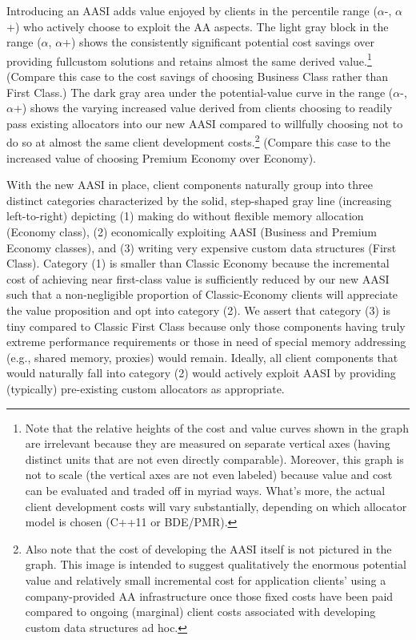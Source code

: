 Introducing an AASI adds value enjoyed by clients in the percentile range ($\alpha$-, $\alpha$+)
who actively choose to exploit the AA aspects. The light gray block in the range ($\alpha$,
$\alpha$+) shows the consistently significant potential cost savings over providing fullcustom solutions and retains almost the same derived value.\footnote{Note that the relative heights of the cost and value curves shown in the graph are irrelevant
because they are measured on separate vertical axes (having distinct units that are not even directly
comparable). Moreover, this graph is not to scale (the vertical axes are not even labeled) because
value and cost can be evaluated and traded off in myriad ways. What’s more, the actual client
development costs will vary substantially, depending on which allocator model is chosen (C++11 or
BDE/PMR).} (Compare this case to
the cost savings of choosing Business Class rather than First Class.) The dark gray
area under the potential-value curve in the range ($\alpha$-, $\alpha$+) shows the varying
increased value derived from clients choosing to readily pass existing allocators into
our new AASI compared to willfully choosing not to do so at almost the same client
development costs.\footnote{Also note that the cost of developing the AASI itself is not pictured in the graph. This image is
intended to suggest qualitatively the enormous potential value and relatively small incremental cost
for application clients’ using a company-provided AA infrastructure once those fixed costs have been
paid compared to ongoing (marginal) client costs associated with developing custom data structures
ad hoc.}  (Compare this case to the increased value of choosing Premium
Economy over Economy).

With the new AASI in place, client components naturally group into three distinct
categories characterized by the solid, step-shaped gray line (increasing left-to-right)
depicting (1) making do without flexible memory allocation (Economy class), (2)
economically exploiting AASI (Business and Premium Economy classes), and (3)
writing very expensive custom data structures (First Class). Category (1) is smaller
than Classic Economy because the incremental cost of achieving near first-class
value is sufficiently reduced by our new AASI such that a non-negligible proportion
of Classic-Economy clients will appreciate the value proposition and opt into
category (2). We assert that category (3) is tiny compared to Classic First Class
because only those components having truly extreme performance requirements or
those in need of special memory addressing (e.g., shared memory, proxies) would
remain. Ideally, all client components that would naturally fall into category (2)
would actively exploit AASI by providing (typically) pre-existing custom allocators as
appropriate.


